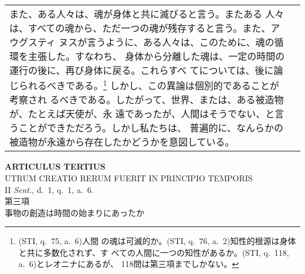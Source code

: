 \documentclass[10pt]{jsarticle} %
\begin{document}
\begin{longtable}{p{21em}p{21em}}
また、ある人々は、魂が身体と共に滅びると言う。またある
人々は、すべての魂から、ただ一つの魂が残存すると言う。また、アウグスティ
ヌスが言うように、ある人々は、このために、魂の循環を主張した。すなわち、
身体から分離した魂は、一定の時間の運行の後に、再び身体に戻る。これらすべ
てについては、後に論じられるべきである。\footnote {(STI, q.~75, a.~6)人間
の魂は可滅的か。(STI, q.~76, a.~2)知性的根源は身体と共に多数化されず、す
べての人間に一つの知性があるか。(STI, q.~118, a.~6)とレオニナにあるが、
118問は第三項までしかない。} しかし、この異論は個別的であることが考察され
るべきである。したがって、世界、または、ある被造物が、たとえば天使が、永
遠であったが、人間はそうでない、と言うことができただろう。しかし私たちは、
普遍的に、なんらかの被造物が永遠から存在したかどうかを意図している。

\\

\end{longtable}

\newpage
{}
\begin{center}
 {\Large {\bf ARTICULUS TERTIUS}}\\
 {\large UTRUM CREATIO RERUM FUERIT IN PRINCIPIO TEMPORIS}\\
 {\footnotesize II {\itshape Sent.}, d.~1, q.~1, a.~6.}\\
 {\Large 第三項\\事物の創造は時間の始まりにあったか}
\end{center}
\end{document}
